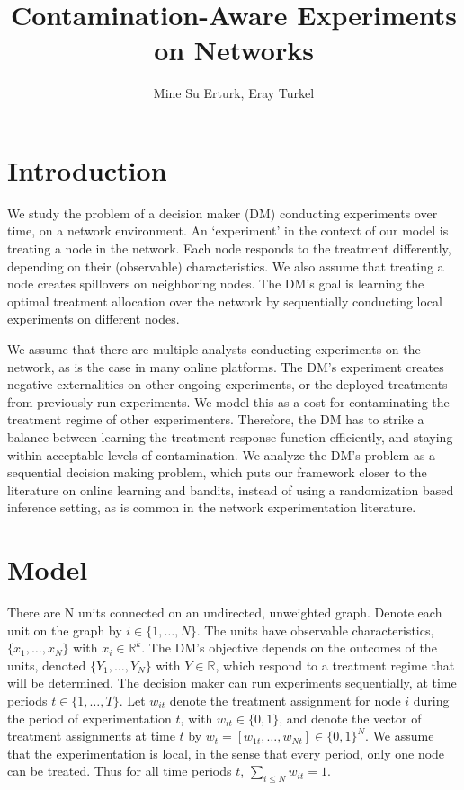 \documentclass[11pt,a4paper]{article}
\author{Mine Su Erturk, Eray Turkel}
\title{ Contamination-Aware Experiments on Networks }
\begin{document}
\maketitle

\section{Introduction}
We study the problem of a decision maker (DM) conducting experiments over time, on a network environment. An `experiment' in the context of our model is treating a node in the network. Each node responds to the treatment differently, depending on their (observable) characteristics. We also assume that treating a node creates spillovers on neighboring nodes. The DM's goal is learning the optimal treatment allocation over the network by sequentially conducting local experiments on different nodes. 

We assume that there are multiple analysts conducting experiments on the network, as is the case in many online platforms. The DM's experiment creates negative externalities on other ongoing experiments, or the deployed treatments from previously run experiments. We model this as a cost for contaminating the treatment regime of other experimenters. Therefore, the DM has to strike a balance between learning the treatment response function efficiently, and staying within acceptable levels of contamination. We analyze the DM's problem as a sequential decision making problem, which puts our framework closer to the literature on online learning and bandits, instead of using a randomization based inference setting, as is common in the network experimentation literature.

\section{Model}

There are N units connected on an undirected, unweighted graph. Denote each unit on the graph by $i \in \{1, \dots, N \}$. The units have observable characteristics, $\{x_1 , \dots, x_N \}$ with $x_i \in \mathbb{R}^k$. The DM's objective depends on the outcomes of the units, denoted $\{Y_1 , \dots, Y_N\}$ with $Y \in \mathbb{R}$, which respond to a treatment regime that will be determined. The decision maker can run experiments sequentially, at time periods $t \in \{1, \dots , T\}$. Let $w_{it}$ denote the treatment assignment for node $i$ during the period of experimentation $t$, with $w_{it} \in \{0,1\}$, and denote the vector of treatment assignments at time $t$ by $w_t = [w_{1t}, \dots , w_{Nt}] \in \{0,1\}^N$. We assume that the experimentation is local, in the sense that every period, only one node can be treated. Thus for all time periods $t$, $\sum_{i \leq N} w_{it} = 1$.
\end{document}
